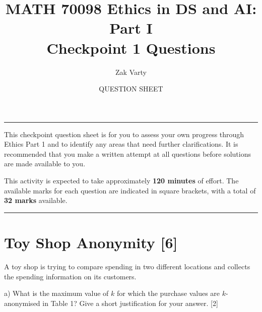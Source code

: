 \documentclass[a4paper, 11pt]{article}
\title{MATH 70098 Ethics in DS and AI: Part I \\ \textbf{Checkpoint 1 Questions}}
\author{Zak Varty}
\date{QUESTION SHEET}
\begin{document}
\maketitle

\hrule

This checkpoint question sheet is for you to assess your own progress through Ethics Part 1 and to identify any areas that need further clarifications. It is recommended that you make a written attempt at all questions before solutions are made available to you.

This activity is expected to take approximately \textbf{120 minutes} of effort. The available marks for each question are indicated in square brackets, with a total of \textbf{32 marks} available.


\vspace{1em} 
 
\hrule

\section{Toy Shop Anonymity [6] }

A toy shop is trying to compare spending in two different locations and collects the spending information on its customers.



a) What is the maximum value of $k$ for which the purchase values are $k$-anonymised in Table 1? Give a short justification for your answer. [2]

\end{document}
